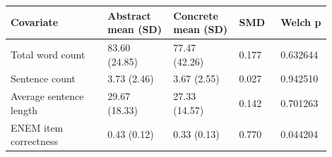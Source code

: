 \begin{tabular}{p{0.28\linewidth}p{0.19\linewidth}p{0.19\linewidth}p{0.12\linewidth}p{0.12\linewidth}}
\toprule
Covariate & Abstract mean (SD) & Concrete mean (SD) & SMD & Welch p\\
\midrule
Total word count & 83.60 (24.85) & 77.47 (42.26) & 0.177 & 0.632644\\
Sentence count & 3.73 (2.46) & 3.67 (2.55) & 0.027 & 0.942510\\
Average sentence length & 29.67 (18.33) & 27.33 (14.57) & 0.142 & 0.701263\\
ENEM item correctness & 0.43 (0.12) & 0.33 (0.13) & 0.770 & 0.044204\\
\bottomrule
\end{tabular}
